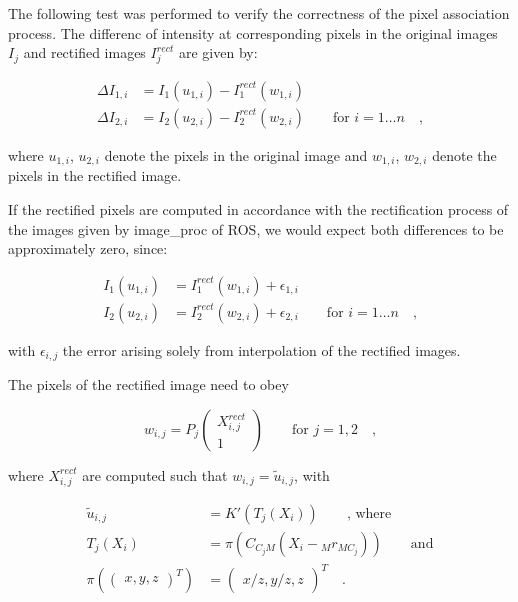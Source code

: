 The following test was performed to verify the correctness of the pixel
association process. 
The differenc of intensity at corresponding pixels in the original images
$I_{j}$ and rectified images $I_{j}^{rect}$ are given by:

\begin{align}
  \Delta I_{1,i} &= I_1(u_{1,i}) - I_1^{rect}(w_{1,i}) \\
  \Delta I_{2,i} &= I_2(u_{2,i}) - I_2^{rect}(w_{2,i}) 
  \hspace{2em} \text{for } i = 1 \ldots n 
  \hspace{1em}\text{,}
  \label{eqn:rect/I_def}
\end{align}

where $u_{1,i}$, $u_{2,i}$ denote the pixels in the original image and
$w_{1,i}$, $w_{2,i}$ denote the pixels in the rectified image. 

If the rectified pixels are computed in accordance with the rectification
process of the images given by image\_proc of ROS, we would expect both 
differences to be approximately zero, since:

\begin{align}
  I_1(u_{1,i}) &= I_1^{rect}(w_{1,i}) + \epsilon_{1,i} \\
  I_2(u_{2,i}) &= I_2^{rect}(w_{2,i}) + \epsilon_{2,i} 
  \hspace{2em} \text{for } i = 1 \ldots n
  \hspace{1em}\text{,}
  \label{eqn:rect/diffI_eq}
\end{align}

with $\epsilon_{i,j}$ the error arising solely from interpolation of the rectified
images.

The pixels of the rectified image need to obey

\begin{equation}
  w_{i,j} = P_j \begin{pmatrix} X_{i,j}^{rect} \\ 1 \end{pmatrix}
  \hspace{2em} \text{for } j = 1, 2
  \hspace{1em}\text{,}
  \label{eqn:rect/w_def}
\end{equation}

where $X_{i,j}^{rect}$ are computed such that $w_{i,j} = \tilde{u}_{i,j}$, with

\begin{align}
  \tilde{u}_{i,j} &= K'(T_j(X_i)) \hspace{2em} \text{, where} \\
  T_j(X_i) &= \pi(C_{C_j M} (X_i - {_M}r_{MC_j})) \hspace{2em} \text{and} \\
  \pi(\begin{pmatrix} x, y, z \end{pmatrix}^T) &= 
  \begin{pmatrix} x/z, y/z, z \end{pmatrix}^T 
  \hspace{1em}\text{.}
  \label{eqn:rect/utilde_def}
\end{align}

